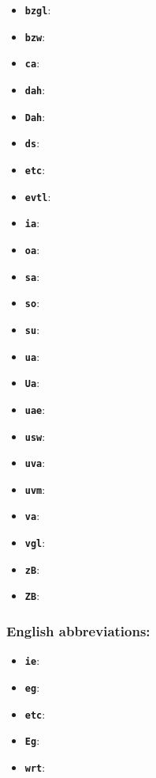 \documentclass[language=english]{hgbarticle}
\begin{document}
\begin{itemize}
    \item \textbf{\texttt{{\bs}bzgl}}: 	\bzgl
    \item \textbf{\texttt{{\bs}bzw}}: 	\bzw
    \item \textbf{\texttt{{\bs}ca}}: 		\ca
    \item \textbf{\texttt{{\bs}dah}}: 	\dah
    \item \textbf{\texttt{{\bs}Dah}}: 	\Dah
    \item \textbf{\texttt{{\bs}ds}}: 		\ds
    \item \textbf{\texttt{{\bs}etc}}: 	\etc
    \item \textbf{\texttt{{\bs}evtl}}: 	\evtl
    \item \textbf{\texttt{{\bs}ia}}: 		\ia
		\item \textbf{\texttt{{\bs}oa}}: 		\oa
    \item \textbf{\texttt{{\bs}sa}}: 		\sa
    \item \textbf{\texttt{{\bs}so}}: 		\so
    \item \textbf{\texttt{{\bs}su}}: 		\su
    \item \textbf{\texttt{{\bs}ua}}: 		\ua
    \item \textbf{\texttt{{\bs}Ua}}: 		\Ua
    \item \textbf{\texttt{{\bs}uae}}: 	\uae
    \item \textbf{\texttt{{\bs}usw}}: 	\usw
    \item \textbf{\texttt{{\bs}uva}}: 	\uva
    \item \textbf{\texttt{{\bs}uvm}}: 	\uvm
    \item \textbf{\texttt{{\bs}va}}: 		\va
    \item \textbf{\texttt{{\bs}vgl}}: 	\vgl
    \item \textbf{\texttt{{\bs}zB}}: 		\zB
    \item \textbf{\texttt{{\bs}ZB}}: 		\ZB
\end{itemize}

\subsubsection*{English abbreviations:}

\begin{itemize}
    \item \textbf{\texttt{{\bs}ie}}: 	\ie
    \item \textbf{\texttt{{\bs}eg}}: 	\eg
    \item \textbf{\texttt{{\bs}etc}}: \etc
    \item \textbf{\texttt{{\bs}Eg}}: 	\Eg
    \item \textbf{\texttt{{\bs}wrt}}: \wrt
\end{itemize}
\end{document}
